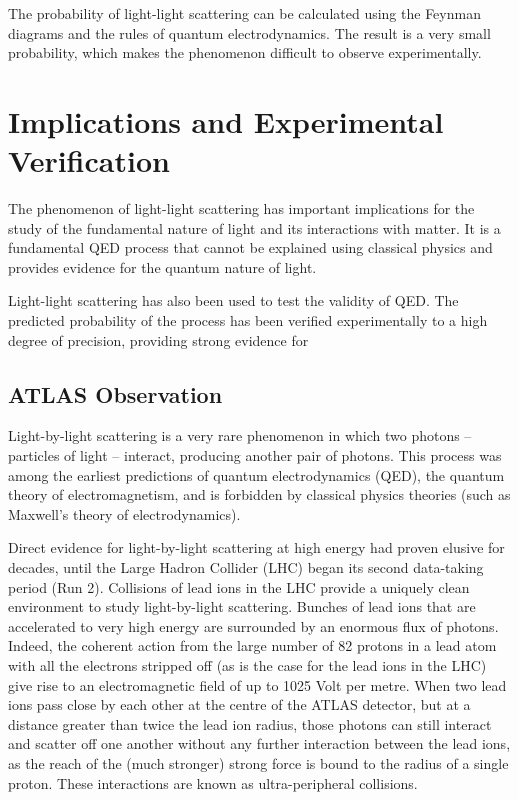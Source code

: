 \documentclass{article}
\begin{document}
The probability of light-light scattering can be calculated using the Feynman diagrams and the rules of quantum electrodynamics. The result is a very small probability, which makes the phenomenon difficult to observe experimentally.

\section{Implications and Experimental Verification}

The phenomenon of light-light scattering has important implications for the study of the fundamental nature of light and its interactions with matter. It is a fundamental QED process that cannot be explained using classical physics and provides evidence for the quantum nature of light.

Light-light scattering has also been used to test the validity of QED. The predicted probability of the process has been verified experimentally to a high degree of precision, providing strong evidence for

\subsection{ATLAS Observation}
Light-by-light scattering is a very rare phenomenon in which two photons – particles of light – interact,
producing another pair of photons. This process was among the earliest predictions of quantum electrodynamics (QED),
the quantum theory of electromagnetism, and is forbidden by classical physics theories (such as
Maxwell's theory of electrodynamics).

Direct evidence for light-by-light scattering at high energy had proven elusive for decades, until the Large Hadron
Collider (LHC) began its second data-taking period (Run 2). Collisions of lead ions in the LHC
provide a uniquely clean environment to study light-by-light scattering. Bunches of lead ions that are accelerated to
very high energy are surrounded by an enormous flux of photons. Indeed, the coherent action from the large number of
82 protons in a lead atom with all the electrons stripped off (as is the case for the lead ions in the LHC)
give rise to an electromagnetic field of up to 1025 Volt per metre. When two lead ions pass close by each
other at the centre of the ATLAS detector, but at a distance greater than twice the lead ion radius, those
photons can still interact and scatter off one another without any further interaction between the lead ions, as the reach of
the (much stronger) strong force is bound to the radius of a single proton. These interactions are
known as ultra-peripheral collisions.
\end{document}
